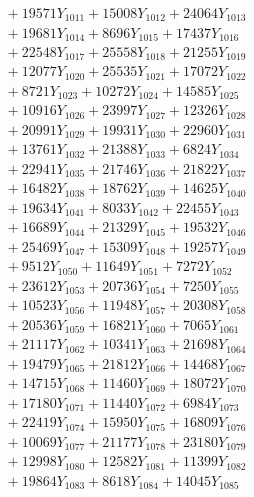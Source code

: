 \documentclass[a4paper,10pt]{article}
\begin{document}
{\begin{align}
&\;  + 19571 Y_{1011} + 15008 Y_{1012} + 24064 Y_{1013} \\[0.3ex]
&\;  + 19681 Y_{1014} + 8696 Y_{1015} + 17437 Y_{1016} \\[0.3ex]
&\;  + 22548 Y_{1017} + 25558 Y_{1018} + 21255 Y_{1019} \\[0.5ex]\allowbreak
&\;  + 12077 Y_{1020} + 25535 Y_{1021} + 17072 Y_{1022} \\[0.3ex]
&\;  + 8721 Y_{1023} + 10272 Y_{1024} + 14585 Y_{1025} \\[0.3ex]
&\;  + 10916 Y_{1026} + 23997 Y_{1027} + 12326 Y_{1028} \\[0.3ex]
&\;  + 20991 Y_{1029} + 19931 Y_{1030} + 22960 Y_{1031} \\[0.3ex]
&\;  + 13761 Y_{1032} + 21388 Y_{1033} + 6824 Y_{1034} \\[0.3ex]
&\;  + 22941 Y_{1035} + 21746 Y_{1036} + 21822 Y_{1037} \\[0.3ex]
&\;  + 16482 Y_{1038} + 18762 Y_{1039} + 14625 Y_{1040} \\[0.3ex]
&\;  + 19634 Y_{1041} + 8033 Y_{1042} + 22455 Y_{1043} \\[0.3ex]
&\;  + 16689 Y_{1044} + 21329 Y_{1045} + 19532 Y_{1046} \\[0.3ex]
&\;  + 25469 Y_{1047} + 15309 Y_{1048} + 19257 Y_{1049} \\[0.5ex]\allowbreak
&\;  + 9512 Y_{1050} + 11649 Y_{1051} + 7272 Y_{1052} \\[0.3ex]
&\;  + 23612 Y_{1053} + 20736 Y_{1054} + 7250 Y_{1055} \\[0.3ex]
&\;  + 10523 Y_{1056} + 11948 Y_{1057} + 20308 Y_{1058} \\[0.3ex]
&\;  + 20536 Y_{1059} + 16821 Y_{1060} + 7065 Y_{1061} \\[0.3ex]
&\;  + 21117 Y_{1062} + 10341 Y_{1063} + 21698 Y_{1064} \\[0.3ex]
&\;  + 19479 Y_{1065} + 21812 Y_{1066} + 14468 Y_{1067} \\[0.3ex]
&\;  + 14715 Y_{1068} + 11460 Y_{1069} + 18072 Y_{1070} \\[0.3ex]
&\;  + 17180 Y_{1071} + 11440 Y_{1072} + 6984 Y_{1073} \\[0.3ex]
&\;  + 22419 Y_{1074} + 15950 Y_{1075} + 16809 Y_{1076} \\[0.3ex]
&\;  + 10069 Y_{1077} + 21177 Y_{1078} + 23180 Y_{1079} \\[0.5ex]\allowbreak
&\;  + 12998 Y_{1080} + 12582 Y_{1081} + 11399 Y_{1082} \\[0.3ex]
&\;  + 19864 Y_{1083} + 8618 Y_{1084} + 14045 Y_{1085} \\[0.3ex]

\end{align}}
\end{document}
